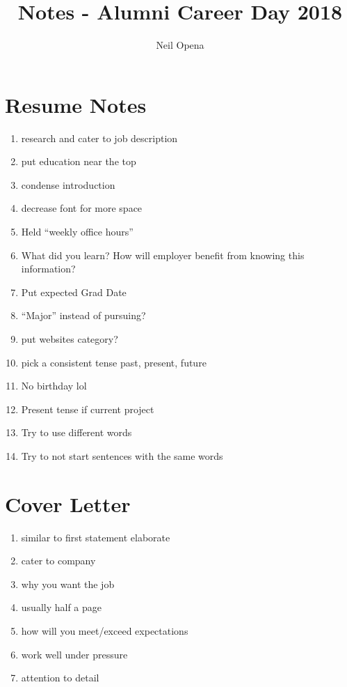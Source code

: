 \documentclass[10pt]{article}
\title{Notes - Alumni Career Day 2018}
\author{Neil Opena}
\date{}
\begin{document}
\maketitle

\section*{Resume Notes}
\begin{enumerate}
    \item research and cater to job description
    \item put education near the top
    \item condense introduction
    \item decrease font for more space
    \item Held ``weekly office hours''
    \item What did you learn? How will employer benefit from knowing this information?
    \item Put expected Grad Date
    \item ``Major'' instead of pursuing?
    \item put websites category?
    \item pick a consistent tense \textrightarrow past, present, future
    \item No birthday lol
    \item Present tense if current project
    \item Try to use different words 
    \item Try to not start sentences with the same words
\end{enumerate}

\section*{Cover Letter}
\begin{enumerate}
    \item similar to first statement \textrightarrow elaborate
    \item cater to company
    \item why you want the job
    \item usually half a page
    \item how will you meet/exceed expectations
    \item work well under pressure
    \item attention to detail
\end{enumerate}
\end{document}

